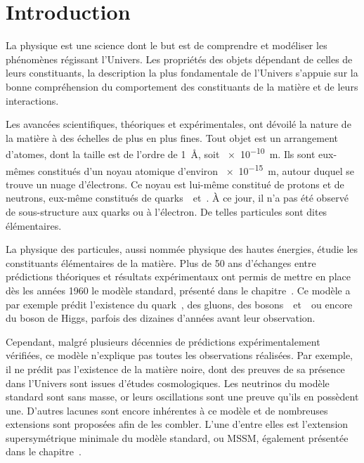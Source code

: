 \chapter*{Introduction}\label{chapter-introduction}

La physique est une science dont le but est de
comprendre et modéliser les phénomènes régissant l'Univers.
Les propriétés des objets dépendant de celles de leurs constituants,
la description la plus fondamentale de l'Univers s'appuie sur la bonne compréhension
du comportement des constituants de la matière et de leurs interactions.
\par
Les avancées scientifiques, théoriques et expérimentales,
ont dévoilé la nature de la matière à des échelles de plus en plus fines.
Tout objet est un arrangement d'atomes, dont la taille est de l'ordre de
\SI{1}{\angstrom}, soit \SI{e-10}{\meter}.
Ils sont eux-mêmes constitués d'un noyau atomique d'environ \SI{e-15}{\meter},
autour duquel se trouve un nuage d'électrons.
Ce noyau est lui-même constitué de protons et de neutrons,
eux-même constitués de quarks~\quarku\ et~\quarkd.
À ce jour, il n'a pas été observé de sous-structure aux quarks ou à l'électron.
De telles particules sont dites élémentaires.
\par
La physique des particules, aussi nommée physique des hautes énergies, étudie les constituants élémentaires de la matière.
Plus de 50 ans d'échanges entre prédictions théoriques et résultats expérimentaux
ont permis de mettre en place dès les années 1960 le modèle standard,
présenté dans le chapitre~.
Ce modèle a par exemple prédit l'existence
du quark~\quarkt,
des gluons,
des bosons~\Wboson\ et~\Zboson\
ou encore
du boson de Higgs,
parfois des dizaines d'années avant leur observation.
\par
Cependant,
malgré plusieurs décennies de prédictions expérimentalement vérifiées,
ce modèle n'explique pas toutes les observations réalisées.
Par exemple,
il ne prédit pas l'existence de la matière noire,
dont des preuves de sa présence dans l'Univers
sont issues d'études cosmologiques.
Les neutrinos du modèle standard sont sans masse,
or 
leurs oscillations sont une preuve qu'ils en possèdent une.
D'autres lacunes sont encore inhérentes à ce modèle
et
de nombreuses extensions sont proposées afin de les combler.
L'une d'entre elles est l'extension supersymétrique minimale du modèle standard, ou MSSM,
également présentée dans le chapitre~\refChMSSM.

